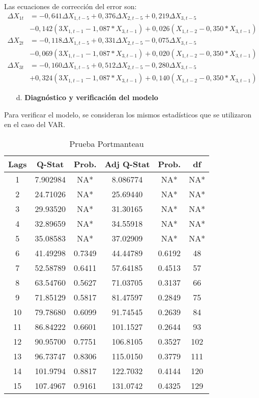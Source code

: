 Las ecuaciones de correcci\'{o}n del error son:
\begin{align*}
\Delta X_{1t} &= -0,641\Delta X_{1,t-5}+0,376\Delta X_{2,t-5}+0,219\Delta X_{3,t-5}\\
            & -0,142\left( 3X_{1,t-1}-1,087\ast X_{3,t-1} \right)+0,026(X_{1,t-2}-0,350\ast X_{3,t-1})\\
\Delta X_{2t} &= -0,118\Delta X_{1,t-5}+0,331\Delta X_{2,t-5}-0,075\Delta X_{3,t-5}\\
            & -0,069\left( 3X_{1,t-1}-1,087\ast X_{3,t-1} \right)+0,020(X_{1,t-2}-0,350\ast X_{3,t-1})\\
\Delta X_{3t} &= -0,160\Delta X_{1,t-5}+0,512\Delta X_{2,t-5}-0,280\Delta X_{3,t-5}\\
            & +0,324\left( 3X_{1,t-1}-1,087\ast X_{3,t-1} \right)+0,140(X_{1,t-2}-0,350\ast X_{3,t-1})
\end{align*}

\begin{enumerate}
\item[d.] \textbf{Diagn\'{o}stico y verificaci\'{o}n del modelo}
\end{enumerate}

Para verificar el modelo, se consideran los mismos estad\'{i}sticos que se utilizaron en el caso del VAR.

\begin{table}[H]
\centering
\begin{tabular}{cccccc}\hline\hline
Lags & Q-Stat & Prob. & Adj Q-Stat & Prob. & df \\ \hline\hline
1 & 7.902984 & NA* & 8.086774 & NA* & NA* \\
2 & 24.71026 & NA* & 25.69440 & NA* & NA* \\
3 & 29.93520 & NA* & 31.30165 & NA* & NA* \\
4 & 32.89659 & NA* & 34.55918 & NA* & NA* \\
5 & 35.08583 & NA* & 37.02909 & NA* & NA* \\
6 & 41.49298 & 0.7349 & 44.44789 & 0.6192 & 48 \\
7 & 52.58789 & 0.6411 & 57.64185 & 0.4513 & 57 \\
8 & 63.54760 & 0.5627 & 71.03705 & 0.3137 & 66 \\
9 & 71.85129 & 0.5817 & 81.47597 & 0.2849 & 75 \\
10 & 79.78680 & 0.6099 & 91.74545 & 0.2639 & 84 \\
11 & 86.84222 & 0.6601 & 101.1527 & 0.2644 & 93 \\
12 & 90.95700 & 0.7751 & 106.8105 & 0.3527 & 102 \\
13 & 96.73747 & 0.8306 & 115.0150 & 0.3779 & 111 \\
14 & 101.9794 & 0.8817 & 122.7032 & 0.4144 & 120 \\
15 & 107.4967 & 0.9161 & 131.0742 & 0.4325 & 129 \\ \hline\hline
\end{tabular}
\caption{Prueba Portmanteau}
\end{table}

